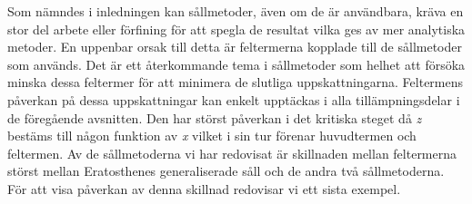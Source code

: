 
Som nämndes i inledningen kan sållmetoder, även om de är användbara, kräva en stor del arbete eller förfining för att spegla de resultat vilka ges av mer analytiska metoder. 
En uppenbar orsak till  detta är feltermerna kopplade till de sållmetoder som används. 
Det är ett återkommande tema i sållmetoder som helhet att försöka minska dessa feltermer för att minimera de slutliga uppskattningarna.
Feltermens påverkan på dessa uppskattningar kan enkelt upptäckas i alla tillämpningsdelar i de föregående avsnitten.
Den har störst påverkan i det kritiska steget då \textit{z} bestäms till någon funktion av \textit{x} vilket i sin tur förenar huvudtermen och feltermen.
Av de sållmetoderna vi har redovisat är skillnaden mellan feltermerna störst mellan Eratosthenes generaliserade såll och de andra två sållmetoderna.
För att visa påverkan av denna skillnad redovisar vi ett sista exempel.

